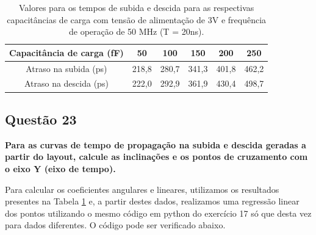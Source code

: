 ﻿\documentclass[12pt,a4paper]{article}
\begin{document}
\begin{table}[H]
    \centering
    \caption{Valores para os tempos de subida e descida para as respectivas capacitâncias de carga com tensão de alimentação de 3V e frequência de operação de 50 MHz (T = 20ns).}
    \label{tab:inverter_delay_values}
    \begin{tabular}{cccccc}
        \toprule
        Capacitância de carga (fF) & 50 & 100 & 150 & 200 & 250 \\
        \midrule
        Atraso na subida (ps) & 218,8 & 280,7 & 341,3 & 401,8 & 462,2 \\
        Atraso na descida (ps) & 222,0 & 292,9 & 361,9 & 430,4 & 498,7 \\
        \bottomrule
    \end{tabular}
\end{table}

\subsection*{Questão 23}

	\textbf{Para as curvas de tempo de propagação na subida e descida geradas a partir do layout, calcule as inclinações e os pontos de cruzamento com o eixo Y (eixo de tempo).}

Para calcular os coeficientes angulares e lineares, utilizamos os resultados presentes na Tabela \ref{tab:inverter_delay_values} e, a partir destes dados, realizamos uma regressão linear dos pontos utilizando o mesmo código em python do exercício 17 só que desta vez para dados diferentes. O código pode ser verificado abaixo.
\end{document}
